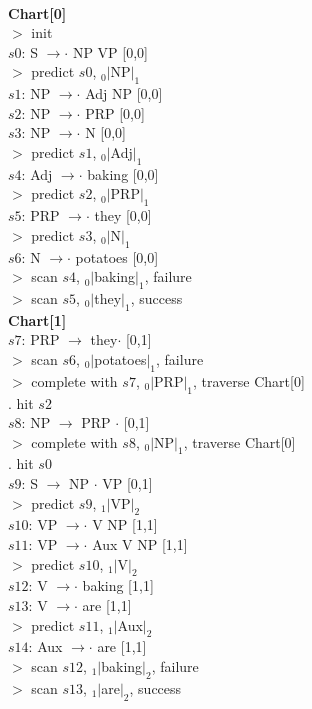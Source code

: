\documentclass[twoside,11pt]{homework}
\begin{document}
\begin{solution}
  \

  \textbf{Chart[0]} \\
  $>$ init\\
  $s0$: S $\rightarrow \cdot$ NP VP [0,0]\\
  $>$ predict $s0$, $_0|$NP$|_1$\\
  $s1$: NP $\rightarrow \cdot$ Adj NP [0,0]\\
  $s2$: NP $\rightarrow \cdot$ PRP [0,0]\\
  $s3$: NP $\rightarrow \cdot$ N [0,0]\\
  $>$ predict $s1$, $_0|$Adj$|_1$\\
  $s4$: Adj $\rightarrow \cdot$ baking [0,0]\\
  $>$ predict $s2$, $_0|$PRP$|_1$\\
  $s5$: PRP $\rightarrow \cdot$ they [0,0]\\
  $>$ predict $s3$, $_0|$N$|_1$\\
  $s6$: N $\rightarrow \cdot$ potatoes [0,0]\\
  $>$ scan $s4$, $_0|$baking$|_1$, failure\\
  $>$ scan $s5$, $_0|$they$|_1$, success\\

  \textbf{Chart[1]}\\
  $s7$: PRP $\rightarrow$ they$\cdot$ [0,1]\\
  $>$ scan $s6$, $_0|$potatoes$|_1$, failure\\
  $>$ complete with $s7$, $_0|$PRP$|_1$, traverse Chart[0]\\
  $.$ hit $s2$\\
  $s8$: NP $\rightarrow$ PRP $\cdot$ [0,1]\\
  $>$ complete with $s8$, $_0|$NP$|_1$, traverse Chart[0]\\
  $.$ hit $s0$\\
  $s9$: S $\rightarrow$ NP $\cdot$ VP [0,1]\\
  $>$ predict $s9$, $_1|$VP$|_2$\\
  $s10$: VP $\rightarrow \cdot$ V NP [1,1]\\
  $s11$: VP $\rightarrow \cdot$ Aux V NP [1,1]\\
  $>$ predict $s10$, $_1|$V$|_2$\\
  $s12$: V $\rightarrow \cdot$ baking [1,1]\\
  $s13$: V $\rightarrow \cdot$ are [1,1]\\
  $>$ predict $s11$, $_1|$Aux$|_2$\\
  $s14$: Aux $\rightarrow \cdot$ are [1,1]\\
  $>$ scan $s12$, $_1|$baking$|_2$, failure\\
  $>$ scan $s13$, $_1|$are$|_2$, success\\


\end{solution}
\end{document}
